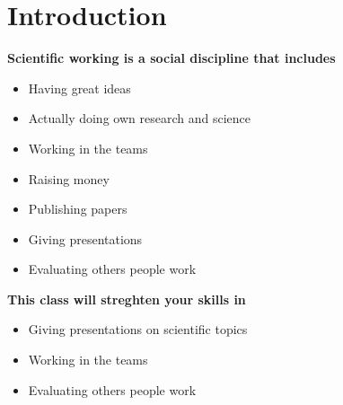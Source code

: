 \section{Introduction}
\begin{frame}
\textbf{Scientific working is a social discipline that includes}
\begin{itemize}
\item Having great ideas
\item Actually doing own research and science
\item Working in the teams
\item Raising money
\item Publishing papers
\item Giving presentations
\item Evaluating others people work
\end{itemize}
\textbf{This class will streghten your skills in}
\begin{itemize}
\item Giving presentations on scientific topics
\item Working in the teams
\item Evaluating others people work
\end{itemize}
\end{frame}

